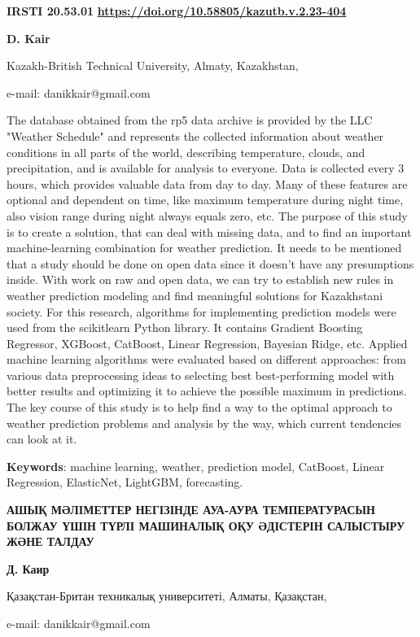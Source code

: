 \newpage
{}
{\bfseries IRSTI 20.53.01}
\hfill {\bfseries \href{https://doi.org/10.58805/kazutb.v.2.23-404}{https://doi.org/10.58805/kazutb.v.2.23-404}}


\begin{center}
{\bfseries D. Kair}

Kazakh-British Technical University, Almaty, Kazakhstan,

e-mail: danikkair@gmail.com
\end{center}

The database obtained from the rp5 data archive is provided by the LLC
"Weather Schedule" and represents the collected information about
weather conditions in all parts of the world, describing temperature,
clouds, and precipitation, and is available for analysis to everyone.
Data is collected every 3 hours, which provides valuable data from day
to day. Many of these features are optional and dependent on time, like
maximum temperature during night time, also vision range during night
always equals zero, etc. The purpose of this study is to create a
solution, that can deal with missing data, and to find an important
machine-learning combination for weather prediction. It needs to be
mentioned that a study should be done on open data since it doesn't have
any presumptions inside. With work on raw and open data, we can try to
establish new rules in weather prediction modeling and find meaningful
solutions for Kazakhstani society. For this research, algorithms for
implementing prediction models were used from the scikitlearn Python
library. It contains Gradient Boosting Regressor, XGBoost, CatBoost,
Linear Regression, Bayesian Ridge, etc. Applied machine learning
algorithms were evaluated based on different approaches: from various
data preprocessing ideas to selecting best best-performing model with
better results and optimizing it to achieve the possible maximum in
predictions. The key course of this study is to help find a way to the
optimal approach to weather prediction problems and analysis by the way,
which current tendencies can look at it.

{\bfseries Keywords}: machine learning, weather, prediction model,
CatBoost, Linear Regression, ElasticNet, LightGBM, forecasting.

\begin{center}
{\large\bfseries АШЫҚ МӘЛІМЕТТЕР НЕГІЗІНДЕ АУА-АУРА ТЕМПЕРАТУРАСЫН БОЛЖАУ ҮШІН
ТҮРЛІ МАШИНАЛЫҚ ОҚУ ӘДІСТЕРІН САЛЫСТЫРУ ЖӘНЕ ТАЛДАУ}

{\bfseries Д. Каир}

Қазақстан-Британ техникалық университеті, Алматы, Қазақстан,

e-mail: danikkair@gmail.com
\end{center}

